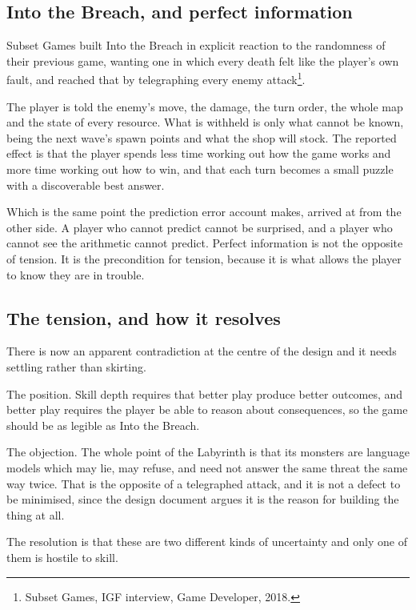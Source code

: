 \documentclass[11pt,a4paper]{article}
\begin{document}
\subsection{Into the Breach, and perfect information}

Subset Games built Into the Breach in explicit reaction to the randomness of their previous
game, wanting one in which every death felt like the player's own fault, and reached that by
telegraphing every enemy attack\footnote{Subset Games, IGF interview, Game Developer, 2018.}.

The player is told the enemy's move, the damage, the turn order, the whole map and the state of
every resource. What is withheld is only what cannot be known, being the next wave's spawn points
and what the shop will stock. The reported effect is that the player spends less time working out
how the game works and more time working out how to win, and that each turn becomes a small
puzzle with a discoverable best answer.

\begin{sectionbox}
Which is the same point the prediction error account makes, arrived at from the other side. A
player who cannot predict cannot be surprised, and a player who cannot see the arithmetic cannot
predict. Perfect information is not the opposite of tension. It is the precondition for tension,
because it is what allows the player to know they are in trouble.
\end{sectionbox}

\subsection{The tension, and how it resolves}

There is now an apparent contradiction at the centre of the design and it needs settling rather
than skirting.

The position. Skill depth requires that better play produce better outcomes, and better play
requires the player be able to reason about consequences, so the game should be as legible as
Into the Breach.

The objection. The whole point of the Labyrinth is that its monsters are language models which
may lie, may refuse, and need not answer the same threat the same way twice. That is the
opposite of a telegraphed attack, and it is not a defect to be minimised, since the design
document argues it is the reason for building the thing at all.

The resolution is that these are two different kinds of uncertainty and only one of them is
hostile to skill.
\end{document}
